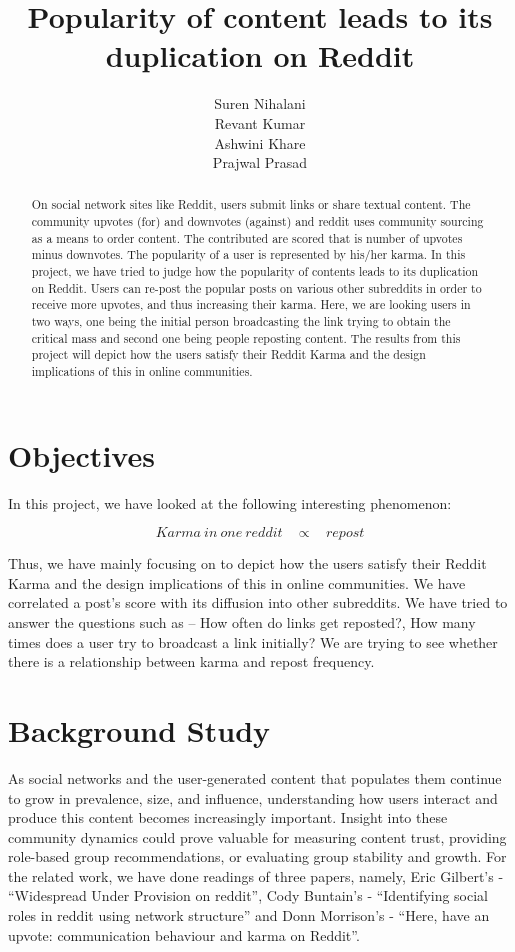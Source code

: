 \documentclass{article} %
\title{Popularity of content leads to its duplication on Reddit}
\author{
Suren Nihalani \\
\And
Revant Kumar \\
\And
Ashwini Khare \\
\And
Prajwal Prasad
}
\begin{document}
\maketitle

\begin{abstract}
On social network sites like Reddit, users submit links or share textual content. The community upvotes (for) and downvotes (against) and reddit uses community sourcing as a means to order content. The contributed are scored that is number of upvotes minus downvotes. The popularity of a user is represented by his/her karma. In this project, we have tried to judge how the popularity of contents leads to its duplication on Reddit. Users can re-post the popular posts on various other subreddits in order to receive more upvotes, and thus increasing their karma. Here, we are looking users in two ways, one being the initial person broadcasting the link trying to obtain the critical mass and second one being people reposting content. The results from this project will depict how the users satisfy their Reddit Karma and the design implications of this in online communities. 
\end{abstract}

\section{Objectives}
In this project, we have looked at the following interesting phenomenon:

\begin{equation} 
Karma\ in\ one\ reddit\ \ \ \ \propto\ \ \ \ repost  \nonumber
\end{equation}

Thus, we have mainly focusing on to depict how the users satisfy their Reddit Karma and the design implications of this in online communities. We have correlated a post's score with its diffusion into other subreddits. We have tried to answer the questions such as -- How often do links get reposted?, How many times does a user try to broadcast a link initially? We are trying to see whether there is a relationship between karma and repost frequency.


\section{Background Study}

As social networks and the user-generated content that populates them continue to grow in prevalence, size, and influence, understanding how users interact and produce this content becomes increasingly important. Insight into these community dynamics could prove valuable for measuring content trust, providing role-based group recommendations, or evaluating group stability and growth. For the related work, we have done readings of three papers, namely, Eric Gilbert's - ``Widespread Under Provision on reddit'', Cody Buntain's - ``Identifying social roles in reddit using network structure'' and Donn Morrison's - ``Here, have an upvote: communication behaviour and karma on Reddit''.
\end{document}
